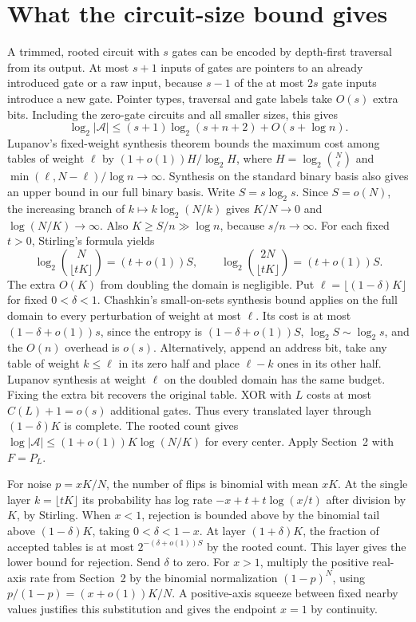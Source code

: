 \documentclass[11pt]{article}
\begin{document}
\section{What the circuit-size bound gives}
A trimmed, rooted circuit with $s$ gates can be encoded by depth-first traversal from its output. At most $s+1$ inputs of gates are pointers to an already introduced gate or a raw input, because $s-1$ of the at most $2s$ gate inputs introduce a new gate. Pointer types, traversal and gate labels take $O(s)$ extra bits. Including the zero-gate circuits and all smaller sizes, this gives
\[
 \log_2 |\mathcal A|\le (s+1)\log_2(s+n+2)+O(s+\log n).
\]
Lupanov's fixed-weight synthesis theorem \cite{lup,kors} bounds the maximum cost among tables of weight $\ell$ by $(1+o(1))H/\log_2 H$, where $H=\log_2\binom{N}{\ell}$ and $\min(\ell,N-\ell)/\log n\to\infty$. Synthesis on the standard binary basis also gives an upper bound in our full binary basis.
Write $S=s\log_2 s$. Since $S=o(N)$, the increasing branch of $k\mapsto k\log_2(N/k)$ gives $K/N\to0$ and $\log(N/K)\to\infty$. Also $K\ge S/n\gg\log n$, because $s/n\to\infty$. For each fixed $t>0$, Stirling's formula yields
\[
 \log_2\binom{N}{\lfloor tK\rfloor}=(t+o(1))S,
 \qquad \log_2\binom{2N}{\lfloor tK\rfloor}=(t+o(1))S .
\]
The extra $O(K)$ from doubling the domain is negligible. Put $\ell=\lfloor(1-\delta)K\rfloor$ for fixed $0<\delta<1$. Chashkin's small-on-sets synthesis bound \cite[Theorem~6.1]{chash} applies on the full domain to every perturbation of weight at most $\ell$. Its cost is at most $(1-\delta+o(1))s$, since the entropy is $(1-\delta+o(1))S$, $\log_2 S\sim\log_2 s$, and the $O(n)$ overhead is $o(s)$. Alternatively, append an address bit, take any table of weight $k\le\ell$ in its zero half and place $\ell-k$ ones in its other half. Lupanov synthesis at weight $\ell$ on the doubled domain has the same budget. Fixing the extra bit recovers the original table. XOR with $L$ costs at most $C(L)+1=o(s)$ additional gates. Thus every translated layer through $(1-\delta)K$ is complete. The rooted count gives $\log|\mathcal A|\le(1+o(1))K\log(N/K)$ for every center. Apply Section~2 with $F=P_L$.

For noise $p=xK/N$, the number of flips is binomial with mean $xK$. At the single layer $k=\lfloor tK\rfloor$ its probability has log rate $-x+t+t\log(x/t)$ after division by $K$, by Stirling. When $x<1$, rejection is bounded above by the binomial tail above $(1-\delta)K$, taking $0<\delta<1-x$. At layer $(1+\delta)K$, the fraction of accepted tables is at most $2^{-(\delta+o(1))S}$ by the rooted count. This layer gives the lower bound for rejection. Send $\delta$ to zero. For $x>1$, multiply the positive real-axis rate from Section~2 by the binomial normalization $(1-p)^N$, using $p/(1-p)=(x+o(1))K/N$. A positive-axis squeeze between fixed nearby values justifies this substitution and gives the endpoint $x=1$ by continuity.
\end{document}
